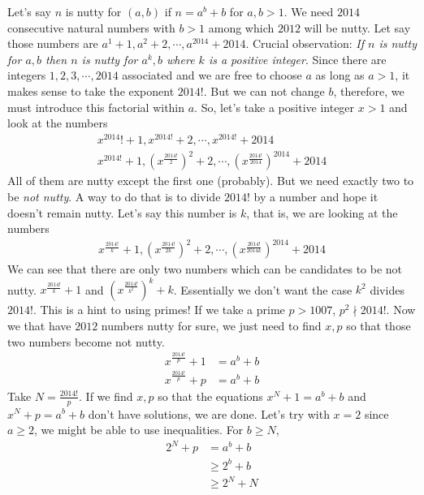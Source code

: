 \documentclass[problems.tex]{subfile}
\begin{document}
	\begin{solution}
		Let's say $n$ is nutty for $(a,b)$ if $n=a^b+b$ for $a,b>1$. We need $2014$ consecutive natural numbers with $b>1$ among which $2012$ will be nutty. Let say those numbers are $a^1+1,a^2+2,\cdots,a^{2014}+2014$. Crucial observation: \textit{If $n$ is nutty for $a,b$ then $n$ is nutty for $a^k,b$ where $k$ is a positive integer}. Since there are integers $1,2,3,\cdots,2014$ associated and we are free to choose $a $ as long as $a>1$, it makes sense to take the exponent $2014!$. But we can not change $b$, therefore, we must introduce this factorial within $a$. So, let's take a positive integer $x>1$ and look at the numbers
			\begin{align*}
				x^{2014}!+1,x^{2014!}+2,\cdots,x^{2014!}+2014\\
				x^{2014!}+1,\left(x^{\frac{2014!}{2}}\right)^2+2,\cdots,\left(x^{\frac{2014!}{2014}}\right)^{2014}+2014
			\end{align*}
		All of them are nutty except the first one (probably). But we need exactly two to be \textit{not nutty}. A way to do that is to divide $2014!$ by a number and hope it doesn't remain nutty. Let's say this number is $k$, that is, we are looking at the numbers
			\begin{align*}
				x^{\frac{2014!}{k}}+1,\left(x^{\frac{2014!}{2k}}\right)^2+2,\cdots,\left(x^{\frac{2014!}{2014k}}\right)^{2014}+2014
			\end{align*}
		We can see that there are only two numbers which can be candidates to be not nutty. $x^{\frac{2014!}{k}}+1$ and $\left(x^{\frac{2014!}{k^2}}\right)^k+k$. Essentially we don't want the case $k^2$ divides $2014!$. This is a hint to using primes! If we take a prime $p>1007$, $p^2\nmid2014!$. Now we that have $2012$ numbers nutty for sure, we just need to find $x,p$ so that those two numbers become not nutty.
			\begin{align*}
				x^{\frac{2014!}{p}}+1 & = a^b+b\\
				x^{\frac{2014!}{p}}+p & = a^b+b
			\end{align*}
		Take $N = \frac{2014!}{p}$. If we find $x,p$ so that the equations $x^N+1=a^b+b$ and $x^N+p = a^b+b$ don't have solutions, we are done. Let's try with $x=2$ since $a\geq2$, we might be able to use inequalities. For $b\geq N$,
			\begin{align*}
				2^N+p & = a^b+b\\
					  &\geq2^b+b\\
					  &\geq2^N+N\\

\end{align*}
\end{solution}
\end{document}
